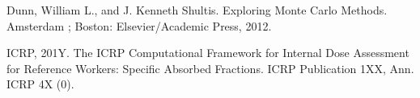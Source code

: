 \documentclass[letterpaper,12pt]{article}
\begin{document}
\begin{thebibliography}{99}


 Dunn, William L., and J. Kenneth Shultis. Exploring Monte Carlo Methods. Amsterdam ; Boston: Elsevier/Academic Press, 2012.

 ICRP, 201Y. The ICRP Computational Framework for Internal Dose Assessment for Reference Workers: Specific Absorbed Fractions. ICRP Publication 1XX, Ann. ICRP 4X (0).


\end{thebibliography}
\end{document}

